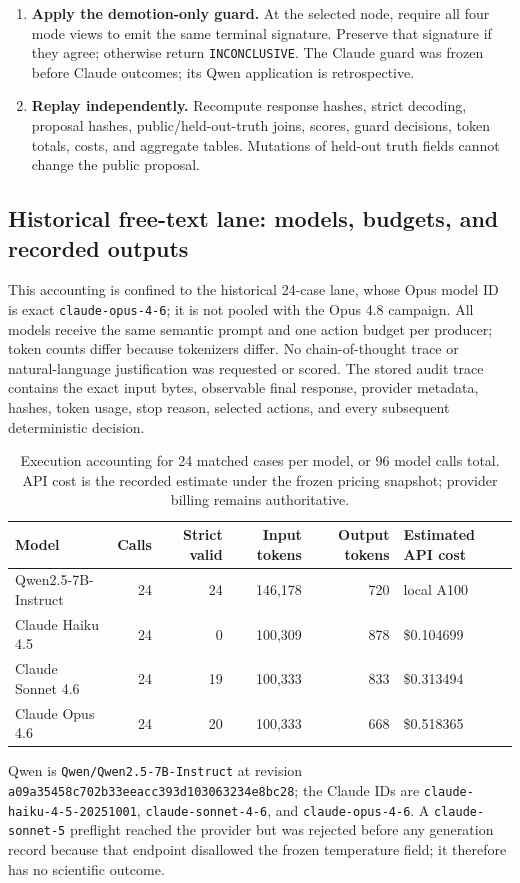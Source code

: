 \documentclass{article}
\newcommand{\INC}{\texttt{INCONCLUSIVE}\xspace}
\begin{document}
\begin{enumerate}[leftmargin=*,nosep]
support/omission label and locked reference. Score held-out-truth-correct, held-out-truth-false, abstention, and
reference disagreement as separate endpoints.
\item \textbf{Apply the demotion-only guard.} At the selected node, require all four mode views to
emit the same terminal signature. Preserve that signature if they agree; otherwise return \INC.
The Claude guard was frozen before Claude outcomes; its Qwen application is retrospective.
\item \textbf{Replay independently.} Recompute response hashes, strict decoding, proposal hashes,
public/held-out-truth joins, scores, guard decisions, token totals, costs, and aggregate tables. Mutations of
held-out truth fields cannot change the public proposal.
\end{enumerate}

\subsection{Historical free-text lane: models, budgets, and recorded outputs}
This accounting is confined to the historical 24-case lane, whose Opus model ID is exact
\texttt{claude-opus-4-6}; it is not pooled with the Opus 4.8 campaign.
All models receive the same semantic prompt and one action budget per producer; token counts differ
because tokenizers differ. No chain-of-thought trace or natural-language
justification was requested or scored. The stored audit trace contains the exact input bytes,
observable final response, provider metadata, hashes, token usage, stop reason, selected actions,
and every subsequent deterministic decision.

\begin{table}[ht]
\centering\scriptsize
\caption{Execution accounting for 24 matched cases per model, or 96 model calls total. API cost is
the recorded estimate under the frozen pricing snapshot; provider billing remains authoritative.}
\begin{tabular}{lrrrrl}
\toprule
Model & Calls & Strict valid & Input tokens & Output tokens & Estimated API cost \\
\midrule
Qwen2.5-7B-Instruct & 24 & 24 & 146,178 & 720 & local A100 \\
Claude Haiku 4.5 & 24 & 0 & 100,309 & 878 & \$0.104699 \\
Claude Sonnet 4.6 & 24 & 19 & 100,333 & 833 & \$0.313494 \\
Claude Opus 4.6 & 24 & 20 & 100,333 & 668 & \$0.518365 \\
\bottomrule
\end{tabular}
\end{table}
Qwen is \texttt{Qwen/Qwen2.5-7B-Instruct} at revision
\nolinkurl{a09a35458c702b33eeacc393d103063234e8bc28}; the Claude IDs are
\texttt{claude-haiku-4-5-20251001}, \texttt{claude-sonnet-4-6}, and
\texttt{claude-opus-4-6}. A \texttt{claude-sonnet-5} preflight reached the provider but was
rejected before any generation record because that endpoint disallowed the frozen temperature
field; it therefore has no scientific outcome.
\end{document}
